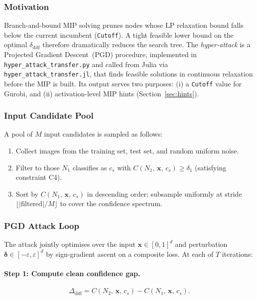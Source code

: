 \documentclass[11pt,a4paper]{article}
\theoremstyle{definition}
\theoremstyle{plain}
\newcommand{\Conf}[3]{C(#1,\,#2,\,#3)}
\newcommand{\NN}[1]{N_{#1}}
\newcommand{\vx}{\mathbf{x}}
\newcommand{\ve}{\boldsymbol{\delta}}
\newcommand{\eps}{\varepsilon}
\newcommand{\deltadiff}{\delta_{\mathrm{diff}}}
\newcommand{\deltaone}{\delta_1}
\begin{document}
\subsubsection{Motivation}

Branch-and-bound MIP solving prunes nodes whose LP relaxation bound falls below the current incumbent (\texttt{Cutoff}). A tight feasible lower bound on the optimal $\deltadiff$ therefore dramatically reduces the search tree. The \emph{hyper-attack} is a Projected Gradient Descent~(PGD) procedure, implemented in \texttt{hyper\_attack\_transfer.py} and called from Julia via \texttt{hyper\_attack\_transfer.jl}, that finds feasible solutions in continuous relaxation before the MIP is built. Its output serves two purposes: (i) a \texttt{Cutoff} value for Gurobi, and (ii) activation-level MIP hints (Section~\ref{sec:hints}).

\subsubsection{Input Candidate Pool}

A pool of $M$ input candidates is sampled as follows:
\begin{enumerate}
  \item Collect images from the training set, test set, and random uniform noise.
  \item Filter to those $\NN{1}$ classifies as $c_s$ with $\Conf{\NN{1}}{\vx}{c_s} \ge \deltaone$ (satisfying constraint C4).
  \item Sort by $\Conf{\NN{1}}{\vx}{c_s}$ in descending order; subsample uniformly at stride $\lfloor|\text{filtered}|/M\rfloor$ to cover the confidence spectrum.
\end{enumerate}

\subsubsection{PGD Attack Loop}

The attack jointly optimises over the input $\vx \in [0,1]^d$ and perturbation $\ve \in [-\eps,\eps]^d$ by sign-gradient ascent on a composite loss. At each of $T$ iterations:

\paragraph{Step 1: Compute clean confidence gap.}
\[
  \Delta_{\mathrm{diff}} = \Conf{\NN{2}}{\vx}{c_s} - \Conf{\NN{1}}{\vx}{c_s}.
\]
\end{document}
